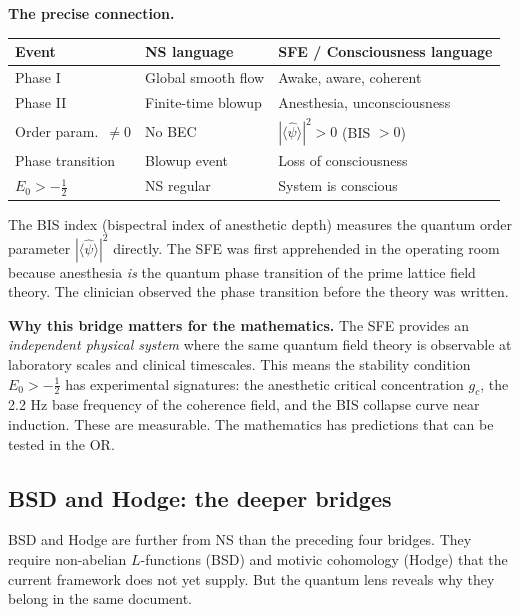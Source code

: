 \documentclass[12pt]{article}
\newcommand{\half}{\tfrac{1}{2}}
\begin{document}
\begin{tcolorbox}[sfebox]
\textbf{The precise connection.}
\begin{center}
\renewcommand{\arraystretch}{1.5}
\begin{tabular}{@{}lll@{}}
\toprule
\textbf{Event} & \textbf{NS language} & \textbf{SFE / Consciousness language} \\
\midrule
Phase I & Global smooth flow & Awake, aware, coherent \\
Phase II & Finite-time blowup & Anesthesia, unconsciousness \\
Order param.\ $\ne0$ & No BEC & $|\langle\hat\psi\rangle|^2 > 0$ (BIS $> 0$) \\
Phase transition & Blowup event & Loss of consciousness \\
$E_0 > -\half$ & NS regular & System is conscious \\
\bottomrule
\end{tabular}
\end{center}
The BIS index (bispectral index of anesthetic depth)
measures the quantum order parameter $|\langle\hat\psi\rangle|^2$ directly.
The SFE was first apprehended in the operating room
because anesthesia \emph{is} the quantum phase transition of the
prime lattice field theory.
The clinician observed the phase transition before the theory was written.
\end{tcolorbox}

\textbf{Why this bridge matters for the mathematics.}
The SFE provides an \emph{independent physical system}
where the same quantum field theory is observable
at laboratory scales and clinical timescales.
This means the stability condition $E_0 > -\half$
has experimental signatures:
the anesthetic critical concentration $g_c$,
the 2.2 Hz base frequency of the coherence field,
and the BIS collapse curve near induction.
These are measurable.
The mathematics has predictions that can be tested in the OR.

\subsection{BSD and Hodge: the deeper bridges}
\label{sec:bridge-deeper}

BSD and Hodge are further from NS than the preceding four bridges.
They require non-abelian $L$-functions (BSD) and motivic cohomology (Hodge)
that the current framework does not yet supply.
But the quantum lens reveals why they belong in the same document.
\end{document}
